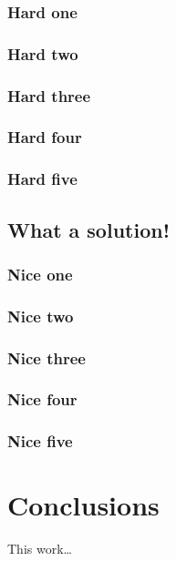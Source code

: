 \documentclass[%
        TwoSidePages,%
        Portuguese,%
        FinalVersion,%
        TablesPage,%
        FiguresPage,%
        ]%
{ic-tese-v2}
\begin{document}
\subsection{Hard one}

\subsection{Hard two}

\subsection{Hard three}

\subsection{Hard four}

\subsection{Hard five}

\section{What a solution!}

\subsection{Nice one}

\subsection{Nice two}

\subsection{Nice three}

\subsection{Nice four}

\subsection{Nice five}

\chapter{Conclusions} %
This work\ldots
\end{document}
